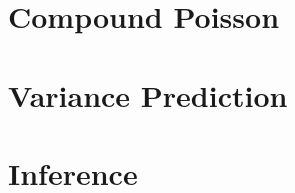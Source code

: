\documentclass[12pt, a4paper]{memoir}
\begin{document}
\chapter{Compound Poisson}


\chapter{Variance Prediction}


\chapter{Inference}





\begin{appendices}

\end{appendices}
\end{document}
